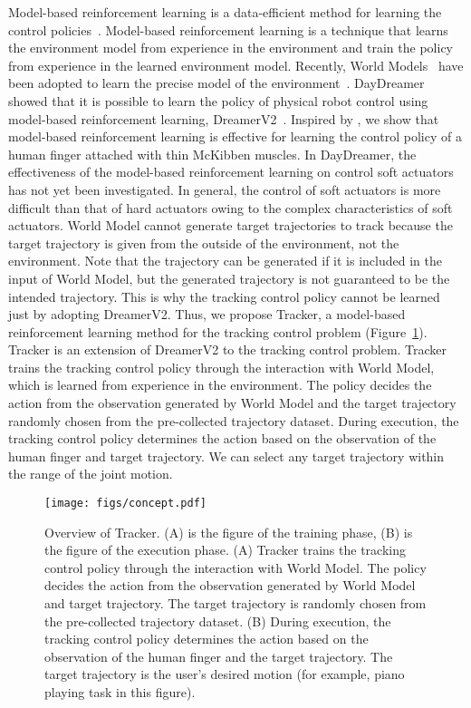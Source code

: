 \documentclass[letterpaper, 10 pt, conference]{ieeeconf}  %
\newcommand{\figref}{Figure~\ref}
\begin{document}
Model-based reinforcement learning is a data-efficient method for learning the control policies~\cite{arulkumaran2017deep}. Model-based reinforcement learning is a technique that learns the environment model from experience in the environment and train the policy from experience in the learned environment model. Recently, World Models~\cite{ha2018world} have been adopted to learn the precise model of the environment~\cite{hafner2020mastering}. DayDreamer~\cite{wu2022daydreamer} showed that it is possible to learn the policy of physical robot control using model-based reinforcement learning, DreamerV2~\cite{hafner2020mastering}. Inspired by \cite{wu2022daydreamer}, we show that model-based reinforcement learning is effective for learning the control policy of a human finger attached with thin McKibben muscles. In DayDreamer, the effectiveness of the model-based reinforcement learning on control soft actuators has not yet been investigated. In general, the control of soft actuators is more difficult than that of hard actuators owing to the complex characteristics of soft actuators. 
World Model cannot generate target trajectories to track because the target trajectory is given from the outside of the environment, not the environment. Note that the trajectory can be generated if it is included in the input of World Model, but the generated trajectory is not guaranteed to be the intended trajectory. This is why the tracking control policy cannot be learned just by adopting DreamerV2. Thus, we propose Tracker, a model-based reinforcement learning method for the tracking control problem (\figref{fig:concept}). Tracker is an extension of DreamerV2 to the tracking control problem. Tracker trains the tracking control policy through the interaction with World Model, which is learned from experience in the environment. The policy decides the action from the observation generated by World Model and the target trajectory randomly chosen from the pre-collected trajectory dataset. During execution, the tracking control policy determines the action based on the observation of the human finger and target trajectory. We can select any target trajectory within the range of the joint motion.

\begin{figure}[t]
  \centering
  \texttt{[image: figs/concept.pdf]}
  \vspace{-5mm}
  \caption{Overview of Tracker. (A) is the figure of the training phase, (B) is the figure of the execution phase. (A) Tracker trains the tracking control policy through the interaction with World Model. The policy decides the action from the observation generated by World Model and target trajectory. The target trajectory is randomly chosen from the pre-collected trajectory dataset. (B) During execution, the tracking control policy determines the action based on the observation of the human finger and the target trajectory. The target trajectory is the user's desired motion (for example, piano playing task in this figure).}
  \label{fig:concept}
  \vspace{-3mm}
\end{figure}
\end{document}
